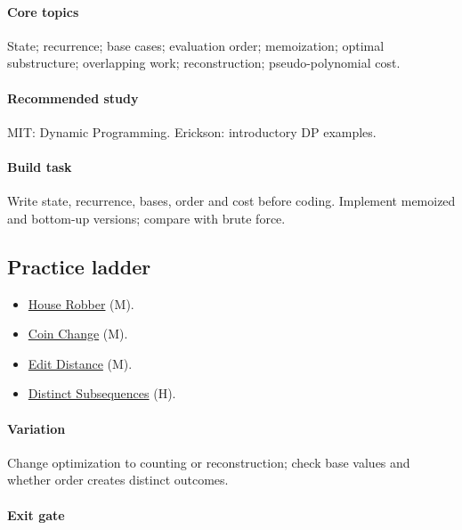 \documentclass[11pt,letterpaper]{article}
\begin{document}
\paragraph*{Core topics}

State; recurrence; base cases; evaluation order; memoization; optimal substructure; overlapping work; reconstruction; pseudo-polynomial cost.

\paragraph*{Recommended study}

MIT: Dynamic Programming. Erickson: introductory DP examples.

\paragraph*{Build task}

Write state, recurrence, bases, order and cost before coding. Implement memoized and bottom-up versions; compare with brute force.

\subsection*{Practice ladder}

\begin{itemize}

\item \href{https://leetcode.com/problems/house-robber/}{House Robber} (M).

\item \href{https://leetcode.com/problems/coin-change/}{Coin Change} (M).

\item \href{https://leetcode.com/problems/edit-distance/}{Edit Distance} (M).

\item \href{https://leetcode.com/problems/distinct-subsequences/}{Distinct Subsequences} (H).

\end{itemize}

\paragraph*{Variation}

Change optimization to counting or reconstruction; check base values and whether order creates distinct outcomes.

\paragraph*{Exit gate}
\end{document}
